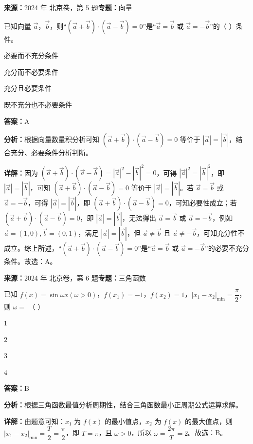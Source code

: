 \begin{question}[points=4]
\textbf{来源：}2024 年 北京卷，第 5 题\quad \textbf{专题：}向量\par
已知向量 $\vec{a}$，$\vec{b}$，则“$(\vec{a}+\vec{b})\cdot(\vec{a}-\vec{b})=0$”是“$\vec{a}=\vec{b}$ 或 $\vec{a}=-\vec{b}$”的（ ）条件。
\begin{choices}
  \item 必要而不充分条件
  \item 充分而不必要条件
  \item 充分且必要条件
  \item 既不充分也不必要条件
\end{choices}
\begin{solution}
\textbf{答案：}A

\textbf{分析：}根据向量数量积分析可知 $(\vec{a}+\vec{b})\cdot(\vec{a}-\vec{b})=0$ 等价于 $|\vec{a}|=|\vec{b}|$，结合充分、必要条件分析判断。

\textbf{详解：}因为 $(\vec{a}+\vec{b})\cdot(\vec{a}-\vec{b}) = |\vec{a}|^2-|\vec{b}|^2=0$，可得 $|\vec{a}|^2=|\vec{b}|^2$，即 $|\vec{a}|=|\vec{b}|$，可知 $(\vec{a}+\vec{b})\cdot(\vec{a}-\vec{b})=0$ 等价于 $|\vec{a}|=|\vec{b}|$。若 $\vec{a}=\vec{b}$ 或 $\vec{a}=-\vec{b}$，可得 $|\vec{a}|=|\vec{b}|$，即 $(\vec{a}+\vec{b})\cdot(\vec{a}-\vec{b})=0$，可知必要性成立；若 $(\vec{a}+\vec{b})\cdot(\vec{a}-\vec{b})=0$，即 $|\vec{a}|=|\vec{b}|$，无法得出 $\vec{a}=\vec{b}$ 或 $\vec{a}=-\vec{b}$，例如 $\vec{a}=(1,0),\vec{b}=(0,1)$，满足 $|\vec{a}|=|\vec{b}|$，但 $\vec{a}\neq\vec{b}$ 且 $\vec{a}\neq-\vec{b}$，可知充分性不成立。综上所述，“$(\vec{a}+\vec{b})\cdot(\vec{a}-\vec{b})=0$”是“$\vec{a}=\vec{b}$ 或 $\vec{a}=-\vec{b}$”的必要不充分条件。故选：A。
\end{solution}
\end{question}

\begin{question}[points=4]
\textbf{来源：}2024 年 北京卷，第 6 题\quad \textbf{专题：}三角函数\par
已知 $f(x)=\sin\omega x(\omega>0)$，$f(x_1)=-1$，$f(x_2)=1$，$|x_1-x_2|_{\min}=\dfrac{\pi}{2}$，则 $\omega=$ （ ）
\begin{choices}
  \item $1$
  \item $2$
  \item $3$
  \item $4$
\end{choices}
\begin{solution}
\textbf{答案：}B

\textbf{分析：}根据三角函数最值分析周期性，结合三角函数最小正周期公式运算求解。

\textbf{详解：}由题意可知：$x_1$ 为 $f(x)$ 的最小值点，$x_2$ 为 $f(x)$ 的最大值点，则 $|x_1-x_2|_{\min}=\dfrac{T}{2}=\dfrac{\pi}{2}$，即 $T=\pi$，且 $\omega>0$，所以 $\omega=\dfrac{2\pi}{T}=2$。故选：B。
\end{solution}
\end{question}

